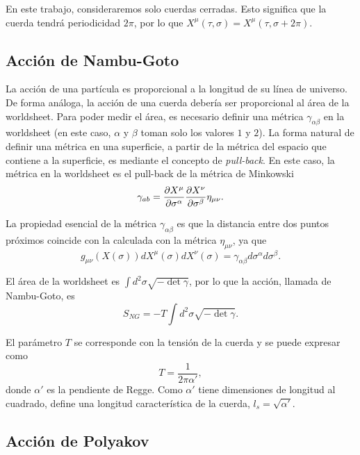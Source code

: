 En este trabajo, consideraremos solo cuerdas cerradas. 
Esto significa que la cuerda tendrá periodicidad $2\pi$, por lo que $X^\mu(\tau,\sigma)=X^\mu(\tau,\sigma+2\pi)$.

\subsection{Acción de Nambu-Goto}

La acción de una partícula es proporcional a la longitud de su línea de universo.
De forma análoga, la acción de una cuerda debería ser proporcional al área de la
worldsheet.
Para poder medir el área, es necesario definir una métrica $\gamma_{\alpha\beta}$ en la worldsheet (en este caso, $\alpha$ y $\beta$ 
toman solo los valores $1$ y $2$).
La forma natural de definir una métrica en una superficie, a partir de la métrica del espacio que
contiene a la superficie, es mediante el concepto de \emph{pull-back}.
En este caso, la métrica en la worldsheet es el pull-back de la métrica de Minkowski
\begin{equation}
  \gamma_{ab}=\pdv{X^\mu}{\sigma^\alpha}\pdv{X^\nu}{\sigma^\beta}\eta_{\mu\nu}.
\end{equation}

La propiedad esencial de la métrica $\gamma_{\alpha\beta}$ es que la distancia entre dos puntos próximos 
coincide con la calculada con la métrica $\eta_{\mu\nu}$, ya que
\begin{equation}
  g_{\mu\nu}(X(\sigma)) dX^\mu(\sigma)dX^\nu(\sigma) = \gamma_{\alpha\beta} d\sigma^\alpha d\sigma^\beta.
\end{equation}

El área de la worldsheet es $\int d^2\sigma \sqrt{-\det\gamma}$, por lo que la acción, llamada de Nambu-Goto, es
\begin{equation}
  S_{NG}=-T\int d^2\sigma \sqrt{-\det\gamma}.
\end{equation}

El parámetro $T$ se corresponde con la tensión de la cuerda y se puede expresar como
\begin{equation}
  T=\frac{1}{2\pi\alpha'},
\end{equation}
donde $\alpha'$ es la pendiente de Regge.
Como $\alpha'$ tiene dimensiones de longitud al cuadrado, define una longitud característica
de la cuerda, $l_s=\sqrt{\alpha'}$.

\subsection{Acción de Polyakov}

